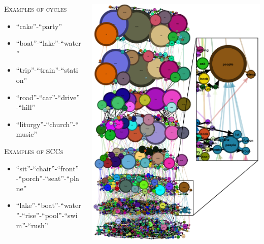 \begin{minipage}[t]{\textwidth}
    \vspace{-0.4cm}
    \begin{columns}
    \begin{column}{0.33\textwidth}
        {\color{orangeUnicam} \scshape \small Examples of cycles}
        {\tiny
        \begin{itemize}
            \item “cake”-“party”
            \item “boat”-“lake”-“water”
            \item “trip”-“train”-“station”
            \item “road”-“car”-“drive”-“hill”
            \item “liturgy”-“church”-“music”
        \end{itemize}}
        \medskip
        {\color{orangeUnicam} \scshape \small Examples of SCCs}
        {\tiny
        \begin{itemize}
            \item “sit”-“chair”-“front”-“porch”-“seat”-“plane”
            \item “lake”-“boat”-“water”-“rise”-“pool”-“swim”-“rush”
        \end{itemize}}
    \end{column}
    \hfill
    \begin{column}{0.66\textwidth}
        \includegraphics[height=0.85\textheight]{immagini/grafo_ml_focus}

\end{column}
\end{columns}
\end{minipage}
